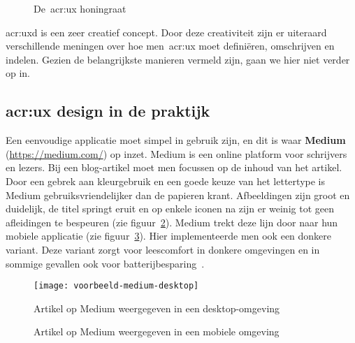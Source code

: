 \begin{figure}
    \centering
    \def\svgwidth{.8\columnwidth}
    
    \caption{De~\acrlong{acr:ux} honingraat}
    \label{fig:ux-facets}
\end{figure}

\acrlong{acr:uxd} is een zeer creatief concept. Door deze creativiteit zijn er uiteraard verschillende meningen over hoe men~\acrlong{acr:ux} moet definiëren, omschrijven en indelen. Gezien de belangrijkste manieren vermeld zijn, gaan we hier niet verder op in.

\subsection{\acrlong{acr:ux} design in de praktijk}
\label{sec:user-experience-in-software:user-experience-design-in-de-praktijk}

Een eenvoudige applicatie moet simpel in gebruik zijn, en dit is waar \textbf{Medium} (\href{https://medium.com/@jtnakagawa/nothing-left-to-take-away-437eb23c2ae8}{https://medium.com/}) op inzet. Medium is een online platform voor schrijvers en lezers. Bij een blog-artikel moet men focussen op de inhoud van het artikel. Door een gebrek aan kleurgebruik en een goede keuze van het lettertype is Medium gebruiksvriendelijker dan de papieren krant. Afbeeldingen zijn groot en duidelijk, de titel springt eruit en op enkele iconen na zijn er weinig tot geen afleidingen te bespeuren (zie figuur~\ref{fig:ux-voorbeeld-medium:desktop}). Medium trekt deze lijn door naar hun mobiele applicatie (zie figuur~\ref{fig:ux-voorbeeld-medium:mobiel}). Hier implementeerde men ook een donkere variant. Deze variant zorgt voor leescomfort in donkere omgevingen en in sommige gevallen ook voor batterijbesparing~\autocite{Jin2017}.

\begin{figure}
    \centering
    \texttt{[image: voorbeeld-medium-desktop]}
    \caption[Voorbeeld Medium desktop]{Artikel op Medium weergegeven in een desktop-omgeving}
    \label{fig:ux-voorbeeld-medium:desktop}
\end{figure}

\begin{figure}
    \centering
    \qquad
    \caption[Voorbeeld Medium mobiel]{Artikel op Medium weergegeven in een mobiele omgeving}
    \label{fig:ux-voorbeeld-medium:mobiel}
\end{figure}

